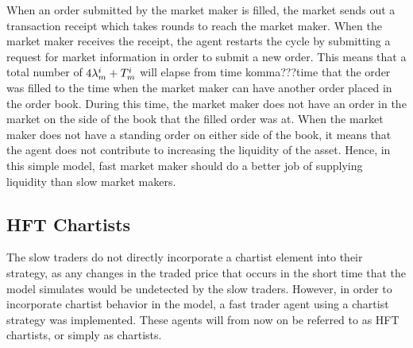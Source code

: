 When an order submitted by the market maker is filled, the market sends out a transaction receipt which takes  rounds to reach the market maker. When the market maker receives the receipt, the agent restarts the cycle by submitting a request for market information in order to submit a new order. This means that a total number of $4\lambda_m^{i} + T_m^{i}$ will elapse from time komma???time that the order was filled to the time when the market maker can have another order placed in the order book. During this time, the market maker does not have an order in the market on the side of the book that the filled order was at. When the market maker does not have a standing order on either side of the book, it means that the agent does not contribute to increasing the liquidity of the asset. Hence, in this simple model, fast market maker should do a better job of supplying liquidity than slow market makers.






\subsection{HFT Chartists}\label{section:hft_chartist}
The slow traders do not directly incorporate a chartist element into their strategy, as any changes in the traded price that occurs in the short time that the model simulates would be undetected by the slow traders. However, in order to incorporate chartist behavior in the model, a fast trader agent using a chartist strategy was implemented. These agents will from now on be referred to as HFT chartists, or simply as chartists. 
